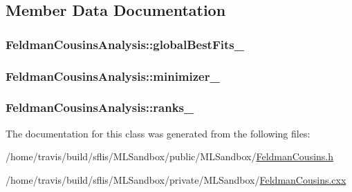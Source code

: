 \subsection{Member Data Documentation}
\hypertarget{classFeldmanCousinsAnalysis_a41ab3fd253179cd5fa77b651d4514fdc}{
\subsubsection[{global\-Best\-Fits\-\_\-}]{ Feldman\-Cousins\-Analysis\-::global\-Best\-Fits\-\_\-}}\label{classFeldmanCousinsAnalysis_a41ab3fd253179cd5fa77b651d4514fdc}
\hypertarget{classFeldmanCousinsAnalysis_a4a16f04a45c379c10b12f76714116226}{
\subsubsection[{minimizer\-\_\-}]{ Feldman\-Cousins\-Analysis\-::minimizer\-\_\-}}\label{classFeldmanCousinsAnalysis_a4a16f04a45c379c10b12f76714116226}
\hypertarget{classFeldmanCousinsAnalysis_a2a83aefd21bd62772ba9b8ef2a0afe37}{
\subsubsection[{ranks\-\_\-}]{ Feldman\-Cousins\-Analysis\-::ranks\-\_\-}}\label{classFeldmanCousinsAnalysis_a2a83aefd21bd62772ba9b8ef2a0afe37}


The documentation for this class was generated from the following files\-:\begin{DoxyCompactItemize}
\item 
/home/travis/build/sflis/\-M\-L\-Sandbox/public/\-M\-L\-Sandbox/\hyperlink{FeldmanCousins_8h}{Feldman\-Cousins.\-h}\item 
/home/travis/build/sflis/\-M\-L\-Sandbox/private/\-M\-L\-Sandbox/\hyperlink{MLSandbox_2FeldmanCousins_8cxx}{Feldman\-Cousins.\-cxx}\end{DoxyCompactItemize}
